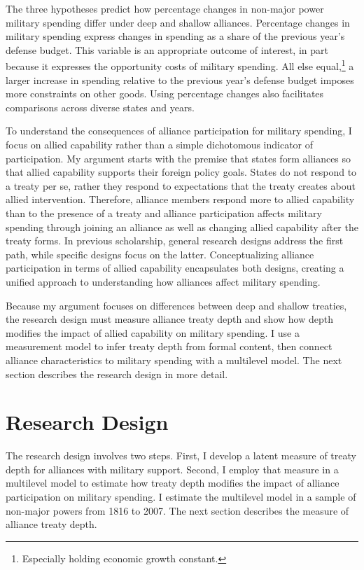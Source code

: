 \documentclass[12pt]{article}
\begin{document}
The three hypotheses predict how percentage changes in non-major power military spending differ under deep and shallow alliances. 
Percentage changes in military spending express changes in spending as a share of the previous year's defense budget.
This variable is an appropriate outcome of interest, in part because it expresses the opportunity costs of military spending. 
All else equal,\footnote{Especially holding economic growth constant.} a larger increase in spending relative to the previous year's defense budget imposes more constraints on other goods. 
Using percentage changes also facilitates comparisons across diverse states and years. 


To understand the consequences of alliance participation for military spending, I focus on allied capability rather than a simple dichotomous indicator of participation.
My argument starts with the premise that states form alliances so that allied capability supports their foreign policy goals. 
States do not respond to a treaty per se, rather they respond to expectations that the treaty creates about allied intervention. 
Therefore, alliance members respond more to allied capability than to the presence of a treaty and alliance participation affects military spending through joining an alliance as well as changing allied capability after the treaty forms. 
In previous scholarship, general research designs address the first path, while specific designs focus on the latter. 
Conceptualizing alliance participation in terms of allied capability encapsulates both designs, creating a unified approach to understanding how alliances affect military spending. 


Because my argument focuses on differences between deep and shallow treaties, the research design must measure alliance treaty depth and show how depth modifies the impact of allied capability on military spending.  
I use a measurement model to infer treaty depth from formal content, then connect alliance characteristics to military spending with a multilevel model. 
The next section describes the research design in more detail. 



\section{Research Design} 


The research design involves two steps. 
First, I develop a latent measure of treaty depth for alliances with military support. 
Second, I employ that measure in a multilevel model to estimate how treaty depth modifies the impact of alliance participation on military spending. 
I estimate the multilevel model in a sample of non-major powers from 1816 to 2007. 
The next section describes the measure of alliance treaty depth. 
\end{document}
